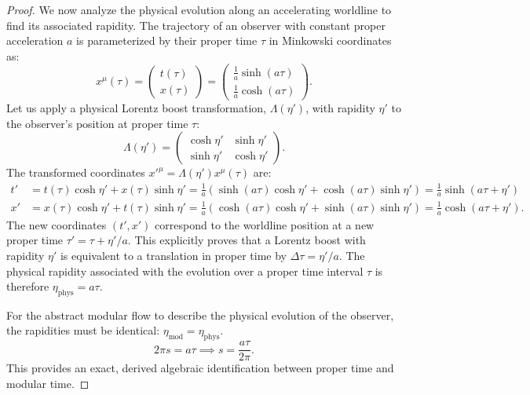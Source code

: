 \documentclass[11pt, letterpaper]{report}
\theoremstyle{plain} %
\theoremstyle{definition} %
\theoremstyle{remark} %
\begin{document}
\begin{proof}
We now analyze the physical evolution along an accelerating worldline to find its associated rapidity. The trajectory of an observer with constant proper acceleration $a$ is parameterized by their proper time $\tau$ in Minkowski coordinates as:
\begin{equation}
    x^\mu(\tau) = \begin{pmatrix} t(\tau) \\ x(\tau) \end{pmatrix} = \begin{pmatrix} \frac{1}{a}\sinh(a\tau) \\ \frac{1}{a}\cosh(a\tau) \end{pmatrix}.
\end{equation}
Let us apply a physical Lorentz boost transformation, $\Lambda(\eta')$, with rapidity $\eta'$ to the observer's position at proper time $\tau$:
\begin{equation}
    \Lambda(\eta') = \begin{pmatrix} \cosh\eta' & \sinh\eta' \\ \sinh\eta' & \cosh\eta' \end{pmatrix}.
\end{equation}
The transformed coordinates $x'^\mu = \Lambda(\eta') x^\mu(\tau)$ are:
\begin{align}
    t' &= t(\tau)\cosh\eta' + x(\tau)\sinh\eta' = \frac{1}{a}\left(\sinh(a\tau)\cosh\eta' + \cosh(a\tau)\sinh\eta'\right) = \frac{1}{a}\sinh(a\tau + \eta') \\
    x' &= x(\tau)\cosh\eta' + t(\tau)\sinh\eta' = \frac{1}{a}\left(\cosh(a\tau)\cosh\eta' + \sinh(a\tau)\sinh\eta'\right) = \frac{1}{a}\cosh(a\tau + \eta').
\end{align}
The new coordinates $(t', x')$ correspond to the worldline position at a new proper time $\tau' = \tau + \eta'/a$. This explicitly proves that a Lorentz boost with rapidity $\eta'$ is equivalent to a translation in proper time by $\Delta\tau = \eta'/a$. The physical rapidity associated with the evolution over a proper time interval $\tau$ is therefore $\eta_{\text{phys}} = a\tau$.

For the abstract modular flow to describe the physical evolution of the observer, the rapidities must be identical: $\eta_{\text{mod}} = \eta_{\text{phys}}$.
\begin{equation}
    2\pi s = a\tau \implies s = \frac{a\tau}{2\pi}.
    \label{eq:s_tau_relation_final}
\end{equation}
This provides an exact, derived algebraic identification between proper time and modular time.


\end{proof}
\end{document}
